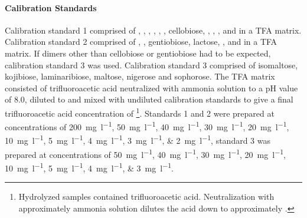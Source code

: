 \paragraph{Calibration Standards}
Calibration standard 1 comprised of \man{}, \glcn{}, \rib{}, \rha{}, \galn{}, \glcnac{}, cellobiose, \glc{}, \gal{}, \xyl{}, \iidglc{} and \iidrib{} in a TFA matrix. Calibration standard 2 comprised of \glcua, \galua{}, gentiobiose, lactose, \galnac{}, \ara{} and \fuc{} in a TFA matrix. If \glc{} dimers other than cellobiose or gentiobiose had to be expected, calibration standard 3 was used. Calibration standard 3 comprised of isomaltose, kojibiose, laminaribiose, maltose, nigerose and sophorose. The TFA matrix consisted of  trifluoroacetic acid neutralized with  ammonia solution to a pH value of \num{8.0}, diluted to  and mixed with undiluted calibration standards to give a final trifluoroacetic acid concentration of \footnote{Hydrolyzed samples contained  trifluoroacetic acid. Neutralization with approximately   ammonia solution dilutes the acid down to approximately .}. Standards 1 and 2 were prepared at concentrations of \SIlist{200;50;40;30;20;10;5;4;3;2}{\milli\gram\per\litre}, standard 3 was prepared at concentrations of \SIlist{50;40;30;20;10;5;4;3}{\milli\gram\per\litre}.


